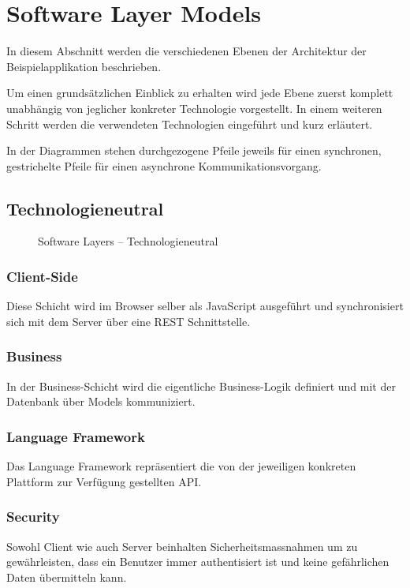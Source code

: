 \section{Software Layer Models}

In diesem Abschnitt werden die verschiedenen Ebenen der Architektur der Beispielapplikation beschrieben.

Um einen grundsätzlichen Einblick zu erhalten wird jede Ebene zuerst komplett unabhängig von jeglicher konkreter Technologie vorgestellt. In einem weiteren Schritt werden die verwendeten Technologien eingeführt und kurz erläutert.

In der Diagrammen stehen durchgezogene Pfeile jeweils für einen synchronen, gestrichelte Pfeile für einen asynchrone Kommunikationsvorgang.


\subsection*{Technologieneutral}

\begin{figure}[ht!]
	\centering{
		
	}

	\caption{Software Layers -- Technologieneutral}
\end{figure}

\subsubsection*{Client-Side}
Diese Schicht wird im Browser selber als JavaScript ausgeführt und synchronisiert sich mit dem Server über eine REST Schnittstelle.

\subsubsection*{Business}
In der Business-Schicht wird die eigentliche Business-Logik definiert und mit der Datenbank über Models kommuniziert.

\subsubsection*{Language Framework}
Das Language Framework repräsentiert die von der jeweiligen konkreten Plattform zur Verfügung gestellten API.

\subsubsection*{Security}
Sowohl Client wie auch Server beinhalten Sicherheitsmassnahmen um zu gewährleisten, dass ein \gls{Benutzer} immer authentisiert ist und keine gefährlichen Daten übermitteln kann.

